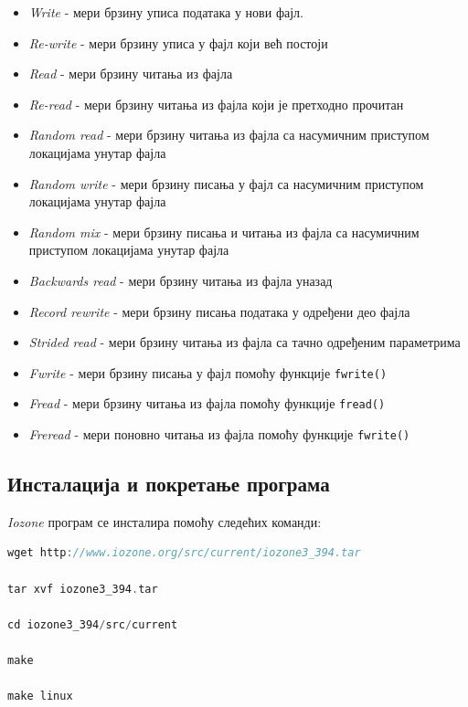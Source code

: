 \begin{itemize}
\item \textit{Write} - мери брзину уписа података у нови фајл.
\item \textit{Re-write} - мери брзину уписа у фајл који већ постоји
\item \textit{Read} - мери брзину читања из фајла
\item \textit{Re-read} - мери брзину читања из фајла који је претходно прочитан
\item \textit{Random read} - мери брзину читања из фајла са насумичним приступом локацијама унутар фајла
\item \textit{Random write} - мери брзину писања у фајл са насумичним приступом локацијама унутар фајла
\item \textit{Random mix} - мери брзину писања и читања из фајла са насумичним приступом локацијама унутар фајла
\item \textit{Backwards read} - мери брзину читања из фајла уназад
\item \textit{Record rewrite} - мери брзину писања података у одређени део фајла
\item \textit{Strided read} - мери брзину читања из фајла са тачно одређеним параметрима
\item \textit{Fwrite} - мери брзину писања у фајл помоћу функције \texttt{fwrite()}
\item \textit{Fread} - мери брзину читања из фајла помоћу функције \texttt{fread()}
\item \textit{Freread} - мери поновно читања из фајла  помоћу функције \texttt{fwrite()}
\end{itemize}


\subsection{Инсталација и покретање програма}

\textit{Iozone} програм се инсталира помоћу следећих команди:
\begin{lstlisting}[style=nonumbers,frame=single,language=C, caption= Инсталација Iozone]
wget http://www.iozone.org/src/current/iozone3_394.tar

tar xvf iozone3_394.tar 

cd iozone3_394/src/current

make

make linux

\end{lstlisting}

